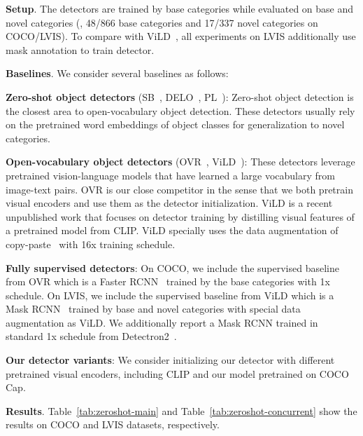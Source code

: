 \noindent \textbf{Setup}. The detectors are trained by base categories while evaluated on base and novel categories (\eg, 48/866 base categories and 17/337 novel categories on COCO/LVIS). To compare with ViLD~\cite{gu2021zero}, all experiments on LVIS additionally use mask annotation to train detector.

\smallskip
\noindent \textbf{Baselines}. We consider several baselines as follows:
\squishlist
\item \textbf{Zero-shot object detectors} (SB~\cite{bansal2018zero}, DELO~\cite{Zhu_2020_CVPR}, PL~\cite{Rahman_aaai2020}): Zero-shot object detection is the closest area to open-vocabulary object detection. These detectors usually rely on the pretrained word embeddings of object classes for generalization to novel categories. 
\item \textbf{Open-vocabulary object detectors} (OVR~\cite{zareian2021open}, ViLD~\cite{gu2021zero}): These detectors leverage pretrained vision-language models that have learned a large vocabulary from image-text pairs. OVR is our close competitor in the sense that we both pretrain visual encoders and use them as the detector initialization. ViLD is a recent unpublished work that focuses on detector training by distilling visual features of a pretrained model from CLIP. ViLD specially uses the data augmentation of copy-paste~\cite{ghiasi2021simple} with 16x training schedule. 
\item \textbf{Fully supervised detectors}: On COCO, we include the supervised baseline from OVR which is a Faster RCNN~\cite{faster-rcnn} trained by the base categories with 1x schedule. On LVIS, we include the supervised baseline from ViLD which is a Mask RCNN~\cite{he2017mask} trained by base and novel categories with special data augmentation as ViLD. We additionally report a Mask RCNN trained in standard 1x schedule from Detectron2~\cite{wu2019detectron2}. 
\item \textbf{Our detector variants}: We consider initializing our detector with different pretrained visual encoders, including CLIP and our model pretrained on COCO Cap.
\squishend


\noindent \textbf{Results}. Table~\ref{tab:zeroshot-main} and Table~\ref{tab:zeroshot-concurrent} show the results on COCO and LVIS datasets, respectively.

